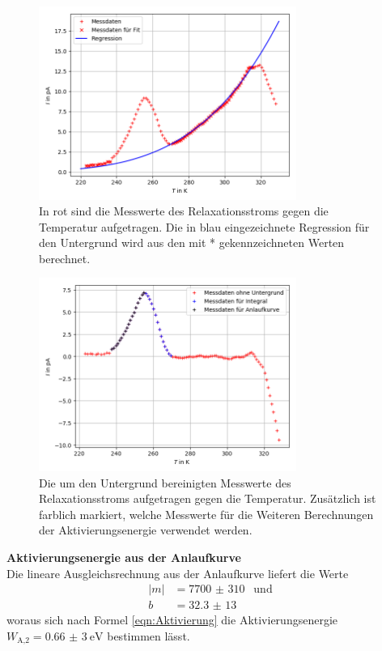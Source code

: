 \begin{figure}[H]
  \centering
  \includegraphics[width=0.75\textwidth]{Dipol2mitUntergrund.png}
  \caption{In rot sind die Messwerte des Relaxationsstroms gegen die Temperatur aufgetragen. Die in
  blau eingezeichnete Regression für den Untergrund wird aus den mit * gekennzeichneten
  Werten berechnet.}
  \label{fig:Abb1}
\end{figure}

\begin{figure}[H]
  \centering
  \includegraphics[width=0.75\textwidth]{Dipol2ohneUntergrund.png}
  \caption{Die um den Untergrund bereinigten Messwerte des Relaxationsstroms aufgetragen gegen die
  Temperatur. Zusätzlich ist farblich markiert, welche Messwerte für die Weiteren Berechnungen der Aktivierungsenergie
  verwendet werden.}
  \label{fig:Abb2}
\end{figure}


\textbf{Aktivierungsenergie aus der Anlaufkurve}\\
Die lineare Ausgleichsrechnung aus der Anlaufkurve liefert die Werte
\begin{align*}
  |m|&=\SI{7700(310)}{}\;\; \text{und}\\
  b&=\SI{32,3(13)}{}
\end{align*}
woraus sich nach Formel \ref{eqn:Aktivierung} die Aktivierungsenergie $W_\text{A,2}=\SI{0,66(3)}{\eV}$
bestimmen lässt.

